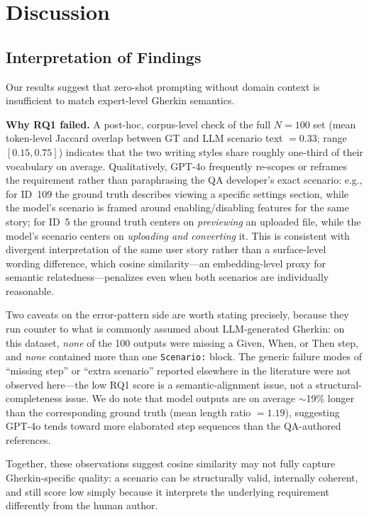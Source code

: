 \section{Discussion}
\label{sec:discussion}

\subsection{Interpretation of Findings}
\label{sec:interpretation}

Our results suggest that zero-shot prompting without domain context is insufficient to match expert-level Gherkin semantics.

\textbf{Why RQ1 failed.}
A post-hoc, corpus-level check of the full $N{=}100$ set (mean token-level Jaccard overlap between GT and LLM scenario text $= 0.33$; range $[0.15, 0.75]$) indicates that the two writing styles share roughly one-third of their vocabulary on average.
Qualitatively, GPT-4o frequently re-scopes or reframes the requirement rather than paraphrasing the QA developer's exact scenario: e.g., for ID~109 the ground truth describes viewing a specific settings section, while the model's scenario is framed around enabling/disabling features for the same story; for ID~5 the ground truth centers on \emph{previewing} an uploaded file, while the model's scenario centers on \emph{uploading and converting} it.
This is consistent with divergent interpretation of the same user story rather than a surface-level wording difference, which cosine similarity---an embedding-level proxy for semantic relatedness---penalizes even when both scenarios are individually reasonable.

Two caveats on the error-pattern side are worth stating precisely, because they run counter to what is commonly assumed about LLM-generated Gherkin: on this dataset, \emph{none} of the 100 outputs were missing a Given, When, or Then step, and \emph{none} contained more than one \texttt{Scenario:} block.
The generic failure modes of ``missing step'' or ``extra scenario'' reported elsewhere in the literature were not observed here---the low RQ1 score is a semantic-alignment issue, not a structural-completeness issue.
We do note that model outputs are on average $\sim$19\% longer than the corresponding ground truth (mean length ratio $= 1.19$), suggesting GPT-4o tends toward more elaborated step sequences than the QA-authored references.

Together, these observations suggest cosine similarity may not fully capture Gherkin-specific quality: a scenario can be structurally valid, internally coherent, and still score low simply because it interprets the underlying requirement differently from the human author.

